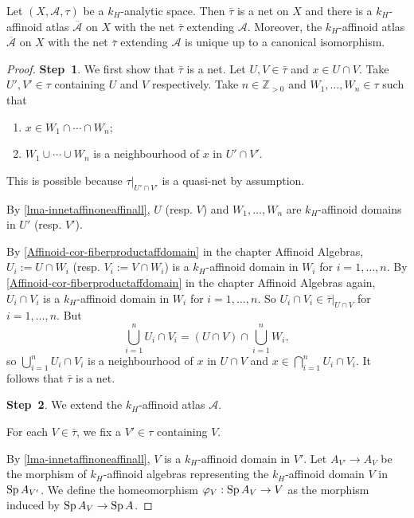 \begin{lemma}
    Let $(X,\mathcal{A},\tau)$ be a $k_H$-analytic space. Then $\bar{\tau}$ is a net on $X$ and there is a $k_H$-affinoid atlas $\overline{\mathcal{A}}$ on $X$ with the net $\bar{\tau}$  extending $\mathcal{A}$. Moreover, the $k_H$-affinoid atlas $\overline{\mathcal{A}}$ on $X$ with the net $\bar{\tau}$  extending $\mathcal{A}$ is unique up to a canonical isomorphism.
\end{lemma}
\begin{proof}
    \textbf{Step~1}.
    We first show that $\bar{\tau}$ is a net. Let $U,V\in \bar{\tau}$ and $x\in U\cap V$. Take $U',V'\in \tau$ containing $U$ and $V$ respectively. Take $n\in \mathbb{Z}_{>0}$ and $W_1,\ldots,W_n\in \tau$ such that 
    \begin{enumerate}
        \item $x\in W_1\cap \cdots \cap W_n$;
        \item $W_1\cup\cdots\cup W_n$ is a neighbourhood of $x$ in $U'\cap V'$.
    \end{enumerate}
    This is possible because $\tau|_{U'\cap V'}$ is a quasi-net by assumption.

    By \cref{lma-innetaffinoneaffinall}, $U$ (resp. $V$) and $W_1,\ldots,W_n$ are $k_H$-affinoid domains in $U'$ (resp. $V'$).

    By \cref{Affinoid-cor-fiberproductaffdomain} in the chapter Affinoid Algebras, $U_i:=U\cap W_i$ (resp. $V_i:=V\cap W_i$) is a $k_H$-affinoid domain in $W_i$  for $i=1,\ldots,n$. By \cref{Affinoid-cor-fiberproductaffdomain} in the chapter Affinoid Algebras again, $U_i\cap V_i$ is a $k_H$-affinoid domain in $W_i$ for $i=1,\ldots,n$. So $U_i\cap V_i\in \bar{\tau}|_{U\cap V}$ for $i=1,\ldots,n$. But
    \[
        \bigcup_{i=1}^n U_i\cap V_i=(U\cap V)\cap \bigcup_{i=1}^n W_i,  
    \]
    so $\bigcup_{i=1}^n U_i\cap V_i$ is a neighbourhood of $x$ in $U\cap V$ and $x\in \bigcap_{i=1}^n U_i\cap V_i$. It follows that $\bar{\tau}$ is a net.

    \textbf{Step~2}. We extend the $k_H$-affinoid atlas $\mathcal{A}$.

    For each $V\in \bar{\tau}$, we fix a $V'\in \tau$ containing $V$. 
    
    By \cref{lma-innetaffinoneaffinall}, $V$ is a $k_H$-affinoid domain in $V'$. Let $A_{V'}\rightarrow A_V$ be the morphism of $k_H$-affinoid algebras representing the $k_H$-affinoid domain $V$ in $\operatorname{Sp} A_{V'}$. We define the homeomorphism $\varphi_V:\operatorname{Sp} A_V\rightarrow V$ as the morphism induced by $\operatorname{Sp} A_V\rightarrow \operatorname{Sp} A$.



\end{proof}
